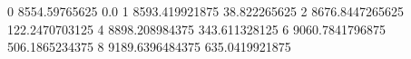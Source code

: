 0 8554.59765625 0.0
1 8593.419921875 38.822265625
2 8676.8447265625 122.2470703125
4 8898.208984375 343.611328125
6 9060.7841796875 506.1865234375
8 9189.6396484375 635.0419921875
